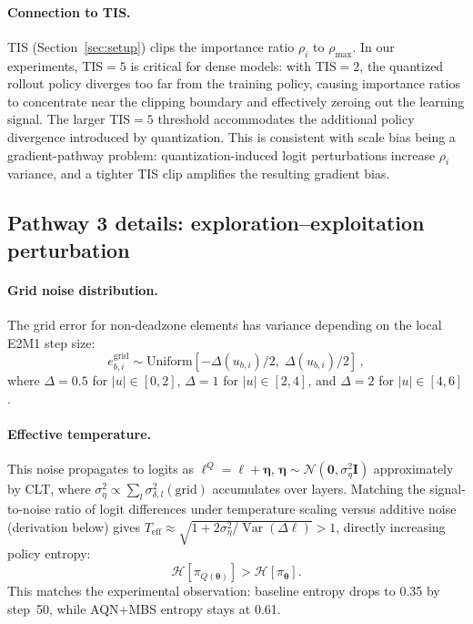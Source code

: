 \documentclass{article}
\theoremstyle{definition}
\theoremstyle{remark}
\DeclareMathOperator{\Var}{Var}
\newcommand{\cH}{\mathcal{H}}
\newcommand{\cN}{\mathcal{N}}
\newcommand{\bell}{\bm{\ell}}
\newcommand{\btheta}{\bm{\theta}}
\newcommand{\boldeta}{\bm{\eta}}
\begin{document}
\paragraph{Connection to TIS.}
TIS (Section~\ref{sec:setup}) clips the importance ratio $\rho_i$ to $\rho_{\max}$. In our experiments, TIS${}=5$ is critical for dense models: with TIS${}=2$, the quantized rollout policy diverges too far from the training policy, causing importance ratios to concentrate near the clipping boundary and effectively zeroing out the learning signal. The larger TIS${}=5$ threshold accommodates the additional policy divergence introduced by quantization. This is consistent with scale bias being a gradient-pathway problem: quantization-induced logit perturbations increase $\rho_i$ variance, and a tighter TIS clip amplifies the resulting gradient bias.


\subsection{Pathway 3 details: exploration--exploitation perturbation}
\label{app:eff_temp}

\paragraph{Grid noise distribution.}
The grid error for non-deadzone elements has variance depending on the local E2M1 step size:
\begin{equation}
  e_{b,i}^{\mathrm{grid}} \sim \mathrm{Uniform}[-\Delta(u_{b,i})/2,\; \Delta(u_{b,i})/2]\,,
\end{equation}
where $\Delta = 0.5$ for $|u|\in[0,2]$, $\Delta = 1$ for $|u|\in[2,4]$, and $\Delta = 2$ for $|u|\in[4,6]$.

\paragraph{Effective temperature.}
This noise propagates to logits as $\bell^Q = \bell + \boldeta$, $\boldeta \sim \cN(\bm{0}, \sigma_\eta^2\bm{I})$ approximately by CLT, where $\sigma_\eta^2 \propto \sum_l \sigma_{\delta,l}^2(\mathrm{grid})$ accumulates over layers. Matching the signal-to-noise ratio of logit differences under temperature scaling versus additive noise (derivation below) gives $T_{\mathrm{eff}} \approx \sqrt{1 + 2\sigma_\eta^2/\Var(\Delta\ell)} > 1$, directly increasing policy entropy:
\begin{equation}
  \cH[\pi_{Q(\btheta)}] > \cH[\pi_{\btheta} ].
\end{equation}
This matches the experimental observation: baseline entropy drops to 0.35 by step~50, while AQN+MBS entropy stays at 0.61.
\end{document}
